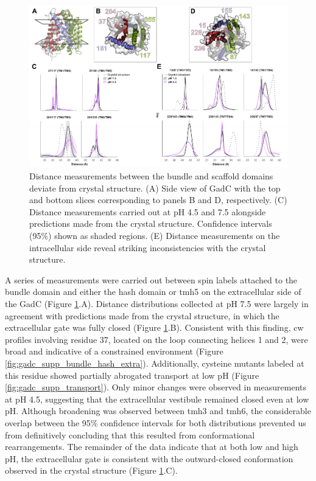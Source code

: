 \begin{figure}[h!]
\centering
\includegraphics[width=6.5in]{Figures/gadc_main_bundle_hash.pdf}
 \caption[Distance measurements between the bundle and scaffold domains reveal deviate from crystal structure.]{Distance measurements between the bundle and scaffold domains deviate from crystal structure. (A) Side view of GadC with the top and bottom slices corresponding to panels B and D, respectively. (C) Distance measurements carried out at pH 4.5 and 7.5 alongside predictions made from the crystal structure. Confidence intervals (95\%) shown as shaded regions. (E) Distance measurements on the intracellular side reveal striking inconsistencies with the crystal structure.}
\label{fig:gadc_main_bundle_hash}
\end{figure}

A series of measurements were carried out between spin labels attached to the bundle domain and either the hash domain or \gls{tmh}5 on the extracellular side of the GadC (Figure \ref{fig:gadc_main_bundle_hash}.A). Distance distributions collected at pH 7.5 were largely in agreement with predictions made from the crystal structure, in which the extracellular gate was fully closed (Figure \ref{fig:gadc_main_bundle_hash}.B). Consistent with this finding, \gls{cw} profiles involving residue 37, located on the loop connecting helices 1 and 2, were broad and indicative of a constrained environment (Figure \ref{fig:gadc_supp_bundle_hash_extra}). Additionally, cysteine mutants labeled at this residue showed partially abrogated transport at low pH (Figure \ref{fig:gadc_supp_transport}). Only minor changes were observed in measurements at pH 4.5, suggesting that the extracellular vestibule remained closed even at low pH. Although broadening was observed between \gls{tmh}3 and \gls{tmh}6, the considerable overlap between the 95\% confidence intervals for both distributions prevented us from definitively concluding that this resulted from conformational rearrangements. The remainder of the data indicate that at both low and high pH, the extracellular gate is consistent with the outward-closed conformation observed in the crystal structure (Figure \ref{fig:gadc_main_bundle_hash}.C).

